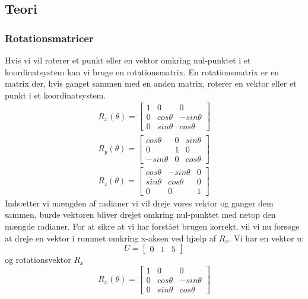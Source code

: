 \subsection{Teori}

\subsubsection{Rotationsmatricer}
Hvis vi vil roterer et punkt eller en vektor omkring nul-punktet i et koordinatsystem kan vi bruge en rotationsmatrix\cite{rotationsmatricer}.
En rotationsmatrix er en matrix der, hvis ganget sammen med en anden matrix, roterer en vektor eller et punkt i et koordinatsystem.
\begin{align}\label{eu_eqn}
  R_x(\theta) = 
  \begin{bmatrix}
    1 & 0 & 0\\ 
    0 & cos \theta & - sin \theta\\ 
    0 & sin \theta & cos \theta
  \end{bmatrix}\\
    R_y(\theta) = 
  \begin{bmatrix}
    cos \theta  & 0 & sin \theta\\ 
    0           & 1 & 0\\ 
    -sin \theta & 0 & cos \theta
  \end{bmatrix}\\
    R_z(\theta) = 
  \begin{bmatrix}
    cos \theta & - sin \theta & 0\\ 
    sin \theta & cos \theta & 0\\
    0 & 0 & 1
  \end{bmatrix}
\end{align}
Indsætter vi mængden af radianer vi vil dreje vores vektor og ganger dem sammen, burde vektoren bliver drejet omkring nul-punktet med netop den mængde radianer.
For at sikre at vi har forstået brugen korrekt, vil vi nu forsøge at dreje en vektor i rummet omkring x-aksen ved hjælp af $R_x$. 
Vi har en vektor u:
\begin{equation}
  U=
  \begin{bmatrix}
    0 & 1 & 5
  \end{bmatrix}
\end{equation}
og rotationsvektor \begin{math}R_x\end{math}
\begin{equation}
  R_x(\theta) = 
  \begin{bmatrix}
    1 & 0 & 0\\ 
    0 & cos \theta & - sin \theta\\ 
    0 & sin \theta & cos \theta
  \end{bmatrix}
\end{equation}
